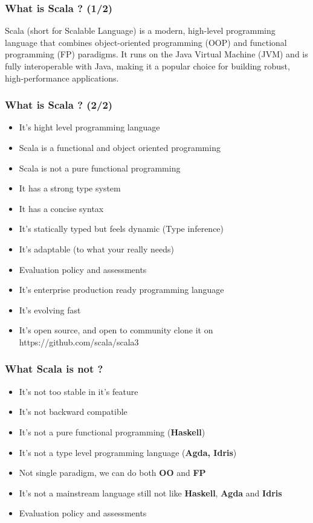 \documentclass{beamer}
\begin{document}

\begin{frame}
\frametitle{What is Scala ? (1/2) }

Scala (short for Scalable Language) is a modern, high-level programming language that combines object-oriented programming (OOP) and functional programming (FP) paradigms. It runs on the Java Virtual Machine (JVM) and is fully interoperable with Java, making it a popular choice for building robust, high-performance applications.

\end{frame}

\begin{frame}
\frametitle{What is Scala ? (2/2) }

\begin{itemize}
    \item It's hight level programming language
    \item Scala is a functional and object oriented programming
    \item Scala is not a pure functional programming
    \item It has a strong type system
    \item It has a concise syntax
    \item It's statically typed but feels dynamic (Type inference)
    \item It's adaptable (to what your really needs)
    \item Evaluation policy and assessments
    \item It's enterprise production ready programming language
    \item It's evolving fast
    \item It's open source, and open to community clone it on https://github.com/scala/scala3
\end{itemize}
\end{frame}


\begin{frame}
\frametitle{What Scala is not ? }

\begin{itemize}
    \item It's not too stable in it's feature
    \item It's not backward compatible
    \item It's not a pure functional programming (\textbf{Haskell})
    \item It's not a type level programming language (\textbf{Agda, Idris})
    \item Not single paradigm, we can do both \textbf{OO} and \textbf{FP} 
    \item It's not a mainstream language still not like \textbf{Haskell}, \textbf{Agda} and \textbf{Idris}
    \item Evaluation policy and assessments
\end{itemize}
\end{frame}
\end{document}
